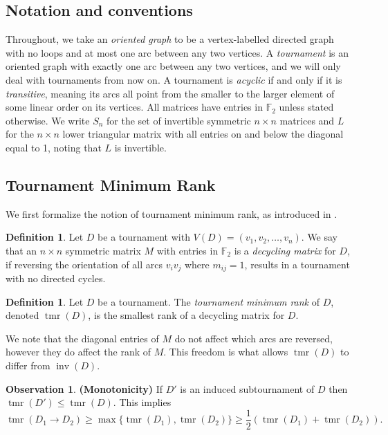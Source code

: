 \documentclass[10pt,a4paper]{amsart}
\numberwithin{equation}{section}
\theoremstyle{plain}
\theoremstyle{remark}
\theoremstyle{definition}
\newtheorem{defn}[thm]{Definition}
\newtheorem{obs}[thm]{Observation}
\newcommand{\tmr}{\operatorname{tmr}}
\newcommand{\inv}{\operatorname{inv}}
\begin{document}
\subsection{Notation and conventions}
  Throughout, we take an \emph{oriented graph} to be a vertex-labelled directed graph with no loops and at most one arc between any two vertices. A \emph{tournament} is an oriented graph with exactly one arc between any two vertices, and we will only deal with tournaments from now on. A tournament is \emph{acyclic} if and only if it is \emph{transitive}, meaning its arcs all point from the smaller to the larger element of some linear order on its vertices. All matrices have entries in $\mathbb{F}_2$ unless stated otherwise. We write $S_n$ for the set of invertible symmetric $n \times n$ matrices and $L$ for the $n \times n$ lower triangular matrix with all entries on and below the diagonal equal to 1, noting that $L$ is invertible. 
  
  
\subsection{Tournament Minimum Rank}\label{sec:tmr}
We first formalize the notion of tournament minimum rank, as introduced in \cite{Natnote}.

\begin{defn}
    Let $D$ be a tournament with $V(D)=(v_1,v_2,\dots,v_n)$. We say that an $n\times n$ symmetric matrix $M$ with entries in $\mathbb{F}_2$ is a \emph{decycling matrix} for $D$, if reversing the orientation of all arcs $v_iv_j$ where $m_{ij}=1$, results in a tournament with no directed cycles.     
\end{defn}
\begin{defn}
Let $D$ be a tournament. The \emph{tournament minimum rank} of $D$, denoted $\tmr(D)$, is the smallest rank of a decycling matrix for $D$.
\end{defn} 

We note that the diagonal entries of $M$ do not affect which arcs are reversed, however they do affect the rank of $M$. This freedom is what allows $\tmr(D)$ to differ from $\inv(D)$. 

\begin{obs} \textbf{(Monotonicity)}
    If $D'$ is an induced subtournament of $D$ then $\tmr(D') \leq \tmr(D)$. This implies
    \begin{equation*}
        \tmr(D_1 \to D_2) \ge \max\{\tmr(D_1),\tmr(D_2)\} \ge \frac{1}{2} ( \tmr(D_1) + \tmr(D_2)).
    \end{equation*}
\end{obs}
\end{document}
